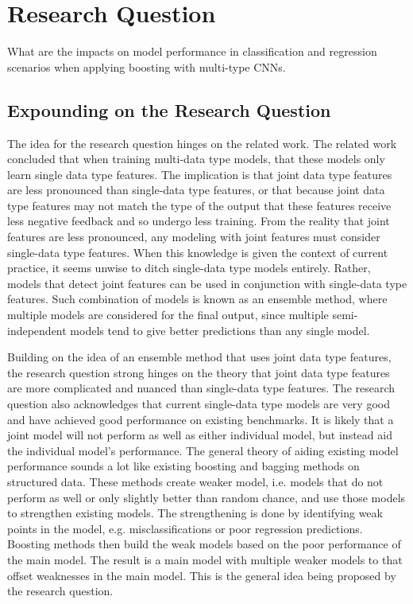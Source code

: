 \section{Research Question}
What are the impacts on model performance in classification and regression scenarios when applying boosting with multi-type CNNs.


\subsection{Expounding on the Research Question}
The idea for the research question hinges on the related work.  The related work concluded that when training multi-data type models, that these models only learn single data type features.  The implication is that joint data type features are less pronounced than single-data type features, or that because joint data type features may not match the type of the output that these features receive less negative feedback and so undergo less training.  From the reality that joint features are less pronounced, any modeling with joint features must consider single-data type features.  When this knowledge is given the context of current practice, it seems unwise to ditch single-data type models entirely.  Rather, models that detect joint features can be used in conjunction with single-data type features.  Such combination of models is known as an ensemble method, where multiple models are considered for the final output, since multiple semi-independent models tend to give better predictions than any single model.

Building on the idea of an ensemble method that uses joint data type features, the research question strong hinges on the theory that joint data type features are more complicated and nuanced than single-data type features.  The research question also acknowledges that current single-data type models are very good and have achieved good performance on existing benchmarks. It is likely that a joint model will not perform as well as either individual model, but instead aid the individual model's performance.  The general theory of aiding existing model performance sounds a lot like existing boosting and bagging methods on structured data.  These methods create weaker model, i.e. models that do not perform as well or only slightly better than random chance, and use those models to strengthen existing models.  The strengthening is done by identifying weak points in the model, e.g. misclassifications or poor regression predictions.  Boosting methods then build the weak models based on the poor performance of the main model.  The result is a main model with multiple weaker models to that offset weaknesses in the main model.  This is the general idea being proposed by the research question.

